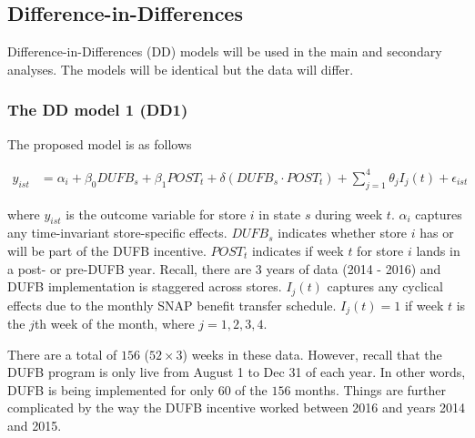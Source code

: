 \documentclass[12pt,letterpaperpaper,]{book}
\begin{document}
\subsection*{Difference-in-Differences}\label{difference-in-differences}

Difference-in-Differences (DD) models will be used in the main and
secondary analyses. The models will be identical but the data will
differ.

\subsubsection{The DD model 1 (DD1)}\label{the-dd-model-1-dd1}

The proposed model is as follows

\[
\begin{aligned}
  y_{ist}  &= \alpha_i + \beta_0 DUFB_{s} + \beta_1 POST_{t} + \delta (DUFB_{s} \cdot POST_{t}) + \sum_{j=1}^4 \theta_{j} I_{j}(t) + \epsilon_{ist}
\end{aligned}
\]

where \(y_{ist}\) is the outcome variable for store \(i\) in state \(s\)
during week \(t\). \(\alpha_i\) captures any time-invariant
store-specific effects. \(DUFB_{s}\) indicates whether store \(i\) has
or will be part of the DUFB incentive. \(POST_{t}\) indicates if week
\(t\) for store \(i\) lands in a post- or pre-DUFB year. Recall, there
are 3 years of data (2014 - 2016) and DUFB implementation is staggered
across stores. \(I_{j}(t)\) captures any cyclical effects due to the
monthly SNAP benefit transfer schedule. \(I_{j}(t) = 1\) if week \(t\)
is the \(j\)th week of the month, where \(j = 1,2,3,4\).

There are a total of \(156\) (\(52 \times 3\)) weeks in these data.
However, recall that the DUFB program is only live from August 1 to Dec
31 of each year. In other words, DUFB is being implemented for only
\(60\) of the \(156\) months. Things are further complicated by the way
the DUFB incentive worked between 2016 and years 2014 and 2015.
\end{document}
